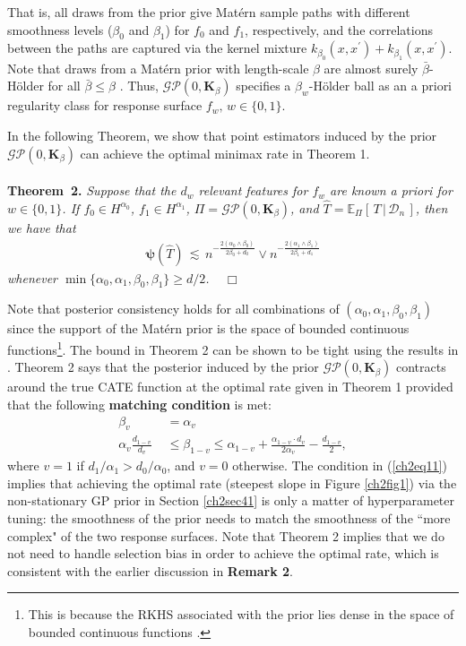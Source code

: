 \documentclass [PhD] {uclathes}
\begin{document}
That is, all draws from the prior give Mat\'ern sample paths with different smoothness levels ($\beta_0$ and $\beta_1$) for $f_0$ and $f_1$, respectively, and the correlations between the paths are captured via the kernel mixture $k_{\beta_0}(x,x^{\prime}) + k_{\beta_1}(x,x^{\prime})$. Note that draws from a Mat\'ern prior with length-scale $\beta$ are almost surely $\bar{\beta}$-H\"older for all $\bar{\beta} \leq \beta$ \cite{vaart2011information}. Thus, $\mathcal{GP}(0,\boldsymbol{K}_{\beta})$ specifies a $\beta_w$-H\"older ball as an a priori regularity class for response surface $f_w,\, w \in \{0,1\}$. 

In the following Theorem, we show that point estimators induced by the prior $\mathcal{GP}(0,\boldsymbol{K}_{\beta})$ can achieve the optimal minimax rate in Theorem 1.\\
\\
\textbf{Theorem~2.} \textit{Suppose that the $d_w$ relevant features for $f_w$ are known a priori for $w \in \{0,1\}$. If $f_0 \in H^{\alpha_0}$, $f_1 \in H^{\alpha_1}$, $\Pi = \mathcal{GP}(0,\boldsymbol{K}_{\beta})$, and $\hat{T} = \mathbb{E}_{\Pi}[\,T\,|\,\mathcal{D}_n\,]$, then we have that} 
\begin{align}
\mathbold{\psi}(\hat{T}) \,\lesssim\, n^{-\frac{2(\alpha_0 \wedge \beta_0)}{2\beta_0 + d_0}} \vee n^{-\frac{2(\alpha_1 \wedge \beta_1)}{2\beta_1 + d_1}}  
\nonumber
\end{align} 
\textit{whenever $\min\{\alpha_0, \alpha_1, \beta_0, \beta_1\} \geq d/2$.} \,\,\, $\mathbf{\Box}$

Note that posterior consistency holds for all combinations of $(\alpha_0, \alpha_1, \beta_0, \beta_1)$ since the support of the Mat\'ern prior is the space of bounded continuous functions\footnote{This is because the RKHS associated with the prior lies dense in the space of bounded continuous functions \cite{van2008rates,van2008reproducing}.}. The bound in Theorem 2 can be shown to be tight using the results in \cite{castillo2008}. Theorem 2 says that the posterior induced by the prior $\mathcal{GP}(0,\boldsymbol{K}_{\beta})$ contracts around the true CATE function at the optimal rate given in Theorem 1 provided that the following \textbf{matching condition} is met:   
\begin{align}
\beta_v \,\,&= \alpha_v \nonumber \\
\alpha_{v}\frac{d_{1-v}}{d_v} \,\,&\leq \beta_{1-v} \leq \alpha_{1-v} + \frac{\alpha_{1-v}\cdot d_{v}}{2\alpha_{v}}-\frac{d_{1-v}}{2},
\label{ch2eq11}
\end{align}
where $v = 1$ if $d_1/\alpha_1 > d_0/\alpha_0$, and $v = 0$ otherwise. The condition in (\ref{ch2eq11}) implies that achieving the optimal rate (steepest slope in Figure \ref{ch2fig1}) via the non-stationary GP prior in Section \ref{ch2sec41} is only a matter of hyperparameter tuning: the smoothness of the prior needs to match the smoothness of the ``more complex" of the two response surfaces. Note that Theorem 2 implies that we do not need to handle selection bias in order to achieve the optimal rate, which is consistent with the earlier discussion in \textbf{Remark 2}. 
\end{document}

